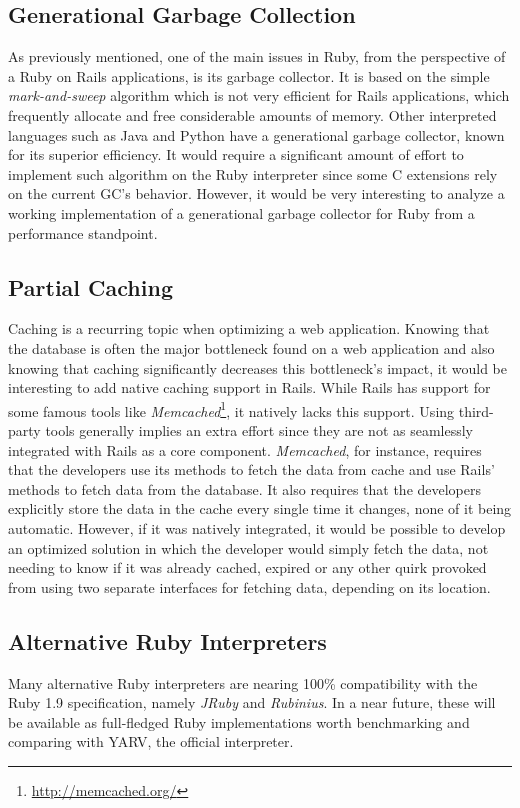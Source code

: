 \subsection{Generational Garbage Collection}
As previously mentioned, one of the main issues in Ruby, from the perspective of a Ruby on Rails applications, is its garbage collector. It is based on the simple \textit{mark-and-sweep} algorithm which is not very efficient for Rails applications, which frequently allocate and free considerable amounts of memory. Other interpreted languages such as Java and Python have a generational garbage collector, known for its superior efficiency. It would require a significant amount of effort to implement such algorithm on the Ruby interpreter since some C extensions rely on the current GC's behavior. However, it would be very interesting to analyze a working implementation of a generational garbage collector for Ruby from a performance standpoint.

\subsection{Partial Caching}
Caching is a recurring topic when optimizing a web application. Knowing that the database is often the major bottleneck found on a web application and also knowing that caching significantly decreases this bottleneck's impact, it would be interesting to add native caching support in Rails. While Rails has support for some famous tools like \textit{Memcached}\footnote{\url{http://memcached.org/}}, it natively lacks this support. Using third-party tools generally implies an extra effort since they are not as seamlessly integrated with Rails as a core component. \textit{Memcached}, for instance, requires that the developers use its methods to fetch the data from cache and use Rails' methods to fetch data from the database. It also requires that the developers explicitly store the data in the cache every single time it changes, none of it being automatic. However, if it was natively integrated, it would be possible to develop an optimized solution in which the developer would simply fetch the data, not needing to know if it was already cached, expired or any other quirk provoked from using two separate interfaces for fetching data, depending on its location. 

\subsection{Alternative Ruby Interpreters}
Many alternative Ruby interpreters are nearing 100\% compatibility with the Ruby 1.9 specification, namely \textit{JRuby} and \textit{Rubinius}. In a near future, these will be available as full-fledged Ruby implementations worth benchmarking and comparing with YARV, the official interpreter.

